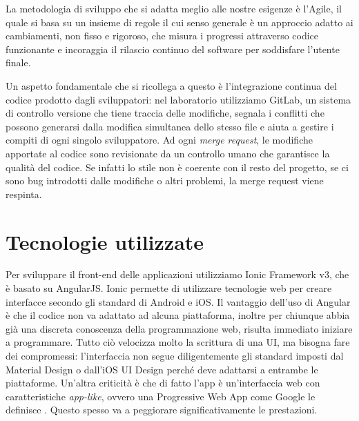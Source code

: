\documentclass[Lau, oneside, noexaminfo]{sapthesis}%
\begin{document}
La metodologia di sviluppo che si adatta meglio alle nostre esigenze è l'Agile, il quale si basa su un insieme di regole il cui senso generale è un approccio adatto ai cambiamenti, non fisso e rigoroso, che misura i progressi attraverso codice funzionante e incoraggia il rilascio continuo del software per soddisfare l'utente finale. 

Un aspetto fondamentale che si ricollega a questo è l'integrazione continua del codice prodotto dagli sviluppatori: nel laboratorio utilizziamo GitLab, un sistema di controllo versione che tiene traccia delle modifiche, segnala i conflitti che possono generarsi dalla modifica simultanea dello stesso file e aiuta a gestire i compiti di ogni singolo sviluppatore.
Ad ogni \textit{merge request}, le modifiche apportate al codice sono revisionate da un controllo umano che garantisce la qualità del codice. Se infatti lo stile non è coerente con il resto del progetto, se ci sono bug introdotti dalle modifiche o altri problemi, la merge request viene respinta.

\section{Tecnologie utilizzate}
\label{sec:tech}
Per sviluppare il front-end delle applicazioni utilizziamo Ionic Framework v3, che è basato su AngularJS. Ionic permette di utilizzare tecnologie web per creare interfacce secondo gli standard di Android e iOS. Il vantaggio dell'uso di Angular è che il codice non va adattato ad alcuna piattaforma, inoltre per chiunque abbia già una discreta conoscenza della programmazione web, risulta immediato iniziare a programmare. Tutto ciò velocizza molto la scrittura di una UI, ma bisogna fare dei compromessi: l'interfaccia non segue diligentemente gli standard imposti dal Material Design o dall'iOS UI Design perché deve adattarsi a entrambe le piattaforme. Un'altra criticità è che di fatto l'app è un'interfaccia web con caratteristiche \textit{app-like}, ovvero una Progressive Web App come Google le definisce \cite{ref:pwa}. Questo spesso va a peggiorare significativamente le prestazioni. 
\end{document}
